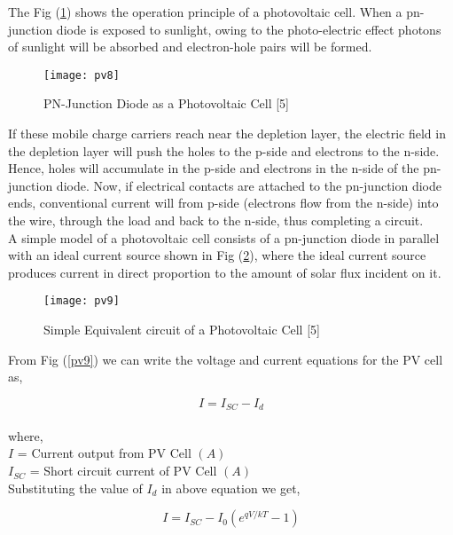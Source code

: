 The Fig (\ref{d2}) shows the operation principle of a photovoltaic cell. When a pn-junction diode is exposed to sunlight, owing to the photo-electric effect photons of sunlight will be absorbed and electron-hole pairs will be formed.

\begin{figure}[H]
\centering
\texttt{[image: pv8]}
\caption{PN-Junction Diode as a Photovoltaic Cell [5]}
\label{d2} %
\end{figure}

If these mobile charge carriers reach near the depletion layer, the electric field in the depletion layer will push the holes to the p-side and electrons to the n-side. Hence, holes will accumulate in the p-side and electrons in the n-side of the pn-junction diode. Now, if electrical contacts are attached to the pn-junction diode ends, conventional current will from p-side (electrons flow from the n-side) into the wire, through the load and back to the n-side, thus completing a circuit.\\

A simple model of a photovoltaic cell consists of a pn-junction diode in parallel with an ideal current source shown in Fig (\ref{p1}), where the ideal current source produces current in direct proportion to the amount of solar flux incident on it.

\begin{figure}[H]
\centering
\texttt{[image: pv9]}
\caption{Simple Equivalent circuit of a Photovoltaic Cell [5]}
\label{p1} %
\end{figure}

From Fig (\ref{pv9}) we can write the voltage and current equations for the PV cell as,

\begin{equation}
\label{pv1}
I = I_{SC}-I_{d}
\end{equation}\\
where,\\
$ I $ = Current output from PV Cell $ (A) $ \\
$ I_{SC} $ = Short circuit current of PV Cell $ (A) $ \\

Substituting the value of $I_{d}$ in above equation we get,

\begin{equation}
\label{pv2}
I = I_{SC}-I_{0} \left(e^{qV/kT}-1 \right )
\end{equation}

